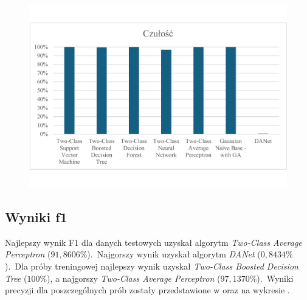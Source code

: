 \begin{figure}[H]
    \centering
    \includegraphics[width=\textwidth]{images/rec-res}
    \label{fig:rec-res}
\end{figure}

\subsection{Wyniki f1}
Najlepszy wynik F1 dla danych testowych uzyskał algorytm \textit{Two-Class Average Perceptron} ($91,8606\%$).\ Najgorszy wynik uzyskał algorytm \textit{DANet} ($0,8434\%$).\ Dla próby treningowej najlepszy wynik uzyskał \textit{Two-Class Boosted Decision Tree} ($100\%$), a najgorszy \textit{Two-Class Average Perceptron} ($97,1370\%$).\ Wyniki precyzji dla poszczególnych prób zostały przedstawione w  oraz na wykresie .

